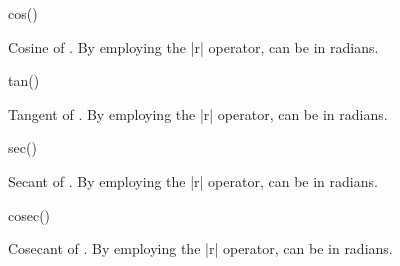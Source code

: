 \begin{math-function}{cos()}
\mathcommand

	Cosine of . By employing the |r| operator,  can be in
	radians.

\begin{codeexample}[]
 \pgfmathresult
\end{codeexample}

\begin{codeexample}[]
 \pgfmathresult
\end{codeexample}

\end{math-function}

\begin{math-function}{tan()}
\mathcommand

	Tangent of . By employing the |r| operator,  can be in
	radians.
	
\begin{codeexample}[]
 \pgfmathresult
\end{codeexample}

\begin{codeexample}[]
 \pgfmathresult
\end{codeexample}

\end{math-function}


\begin{math-function}{sec()}
\mathcommand

	Secant of . By employing the |r| operator,  can be in
	radians.

\begin{codeexample}[]
 \pgfmathresult
\end{codeexample}

\end{math-function}

\begin{math-function}{cosec()}
\mathcommand

	Cosecant of . By employing the |r| operator,  can be in
	radians.
	
\begin{codeexample}[]
 \pgfmathresult
\end{codeexample}

\end{math-function}

